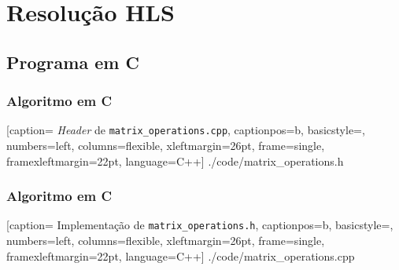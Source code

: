 \documentclass{beamer}
\begin{document}
    \section{Resolução HLS}
    \subsection{Programa em C}
    \begin{frame}[fragile]
        \frametitle{Algoritmo em C}

        
        [caption= \textit{Header} de \texttt{matrix\_operations.cpp},
        captionpos=b,
        basicstyle=\tiny,
        numbers=left,
        columns=flexible,
        xleftmargin=26pt,
        frame=single,
        framexleftmargin=22pt,
        language=C++]
        {./code/matrix_operations.h}
    \end{frame}

    \begin{frame}[fragile]
        \frametitle{Algoritmo em C}

        
        [caption= Implementação de \texttt{matrix\_operations.h},
        captionpos=b,
        basicstyle=\tiny,
        numbers=left,
        columns=flexible,
        xleftmargin=26pt,
        frame=single,
        framexleftmargin=22pt,
        language=C++]
        {./code/matrix_operations.cpp}
    \end{frame}
\end{document}
